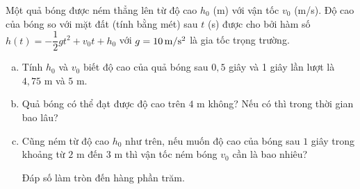 \begin{bt}%
	Một quả bóng được ném thẳng lên từ độ cao $h_0$ (m) với vận tốc $v_0$ (m/s). Độ cao của bóng so với mặt đất (tính bằng mét) sau $t$ (s) được cho bởi hàm số $h(t)=-\dfrac{1}{2}gt^2+v_0t+h_0$ với $g=10\rm{\,m/s^2}$ là gia tốc trọng trường.
	\begin{enumerate}[a)]
		\item Tính $h_0$ và $v_0$ biết độ cao của quả bóng sau $0{,}5$ giây và 1 giây lần lượt là $4{,}75$ m và $5$ m.
		\item Quả bóng có thể đạt được độ cao trên $4$ m không? Nếu có thì trong thời gian bao lâu?
		\item Cũng ném từ độ cao $h_0$ như trên, nếu muốn độ cao của bóng sau $1$ giây trong khoảng từ $2$ m đến $3$ m thì vận tốc ném bóng $v_0$ cần là bao nhiêu?
		\begin{luuy}
			Đáp số làm tròn đến hàng phần trăm.
		\end{luuy} 
	\end{enumerate}
\end{bt}

